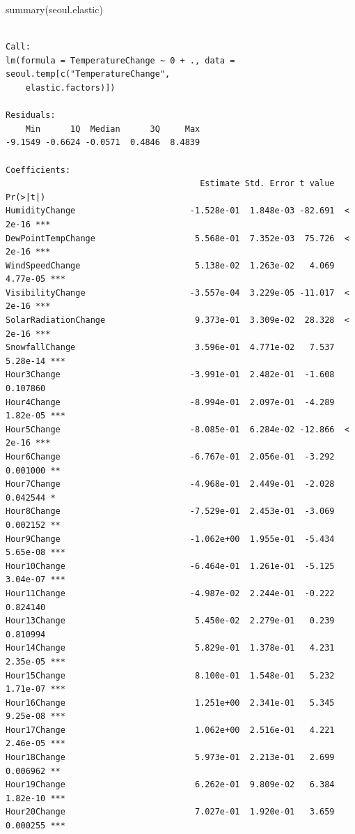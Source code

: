 \documentclass[
  letterpaper,
  DIV=11,
  numbers=noendperiod]{scrartcl}
\newenvironment{Shaded}{\begin{snugshade}}{\end{snugshade}}
\newcommand{\FunctionTok}[1]{\textcolor[rgb]{0.28,0.35,0.67}{#1}}
\newcommand{\NormalTok}[1]{\textcolor[rgb]{0.00,0.23,0.31}{#1}}
\begin{document}
\begin{Shaded}
\begin{Highlighting}[]
\FunctionTok{summary}\NormalTok{(seoul.elastic)}
\end{Highlighting}
\end{Shaded}

\begin{verbatim}

Call:
lm(formula = TemperatureChange ~ 0 + ., data = seoul.temp[c("TemperatureChange", 
    elastic.factors)])

Residuals:
    Min      1Q  Median      3Q     Max 
-9.1549 -0.6624 -0.0571  0.4846  8.4839 

Coefficients:
                                       Estimate Std. Error t value Pr(>|t|)    
HumidityChange                       -1.528e-01  1.848e-03 -82.691  < 2e-16 ***
DewPointTempChange                    5.568e-01  7.352e-03  75.726  < 2e-16 ***
WindSpeedChange                       5.138e-02  1.263e-02   4.069 4.77e-05 ***
VisibilityChange                     -3.557e-04  3.229e-05 -11.017  < 2e-16 ***
SolarRadiationChange                  9.373e-01  3.309e-02  28.328  < 2e-16 ***
SnowfallChange                        3.596e-01  4.771e-02   7.537 5.28e-14 ***
Hour3Change                          -3.991e-01  2.482e-01  -1.608 0.107860    
Hour4Change                          -8.994e-01  2.097e-01  -4.289 1.82e-05 ***
Hour5Change                          -8.085e-01  6.284e-02 -12.866  < 2e-16 ***
Hour6Change                          -6.767e-01  2.056e-01  -3.292 0.001000 ** 
Hour7Change                          -4.968e-01  2.449e-01  -2.028 0.042544 *  
Hour8Change                          -7.529e-01  2.453e-01  -3.069 0.002152 ** 
Hour9Change                          -1.062e+00  1.955e-01  -5.434 5.65e-08 ***
Hour10Change                         -6.464e-01  1.261e-01  -5.125 3.04e-07 ***
Hour11Change                         -4.987e-02  2.244e-01  -0.222 0.824140    
Hour13Change                          5.450e-02  2.279e-01   0.239 0.810994    
Hour14Change                          5.829e-01  1.378e-01   4.231 2.35e-05 ***
Hour15Change                          8.100e-01  1.548e-01   5.232 1.71e-07 ***
Hour16Change                          1.251e+00  2.341e-01   5.345 9.25e-08 ***
Hour17Change                          1.062e+00  2.516e-01   4.221 2.46e-05 ***
Hour18Change                          5.973e-01  2.213e-01   2.699 0.006962 ** 
Hour19Change                          6.262e-01  9.809e-02   6.384 1.82e-10 ***
Hour20Change                          7.027e-01  1.920e-01   3.659 0.000255 ***

\end{verbatim}
\end{document}
